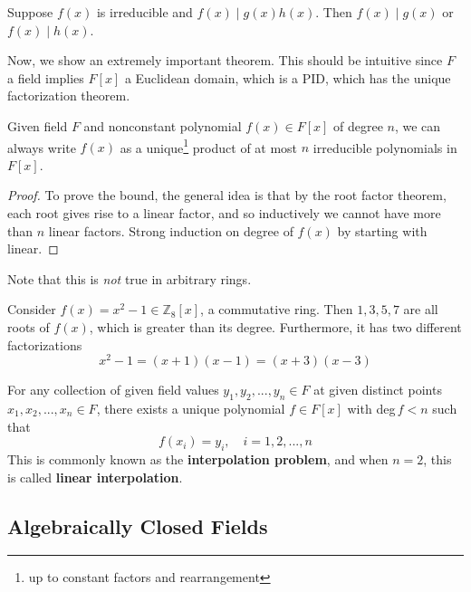   \begin{lemma}
    Suppose $f(x)$ is irreducible and $f(x) \mid g(x) h(x)$. Then $f(x) \mid g(x)$ or $f(x) \mid h(x)$. 
  \end{lemma}

  Now, we show an extremely important theorem. This should be intuitive since $F$ a field implies $F[x]$ a Euclidean domain, which is a PID, which has the unique factorization theorem. 

  \begin{theorem}
    Given field $F$ and nonconstant polynomial $f(x) \in F[x]$ of degree $n$, we can always write $f(x)$ as a unique\footnote{up to constant factors and rearrangement} product of at most $n$ irreducible polynomials in $F[x]$. 
  \end{theorem}
  \begin{proof}
    To prove the bound, the general idea is that by the root factor theorem, each root gives rise to a linear factor, and so inductively we cannot have more than $n$ linear factors.  
    Strong induction on degree of $f(x)$ by starting with linear. 
  \end{proof}

  Note that this is \textit{not} true in arbitrary rings. 

  \begin{example}
    Consider $f(x) = x^2 - 1 \in \mathbb{Z}_8 [x]$, a commutative ring. Then $1, 3, 5, 7$ are all roots of $f(x)$, which is greater than its degree. Furthermore, it has two different factorizations 
    \begin{equation}
      x^2 - 1 = (x + 1)(x - 1) = (x + 3)(x - 3)
    \end{equation}
  \end{example} 

  \begin{theorem}[Interpolation]
    For any collection of given field values $y_1, y_2, ..., y_n \in F$ at given distinct points $x_1, x_2, ..., x_n \in F$, there exists a unique polynomial $f \in F[x]$ with deg$\, f < n$ such that
    \begin{equation}
      f(x_i) = y_i, \quad i = 1, 2, ..., n
    \end{equation}
    This is commonly known as the \textbf{interpolation problem}, and when $n = 2$, this is called \textbf{linear interpolation}. 
  \end{theorem} 

\subsection{Algebraically Closed Fields} 

